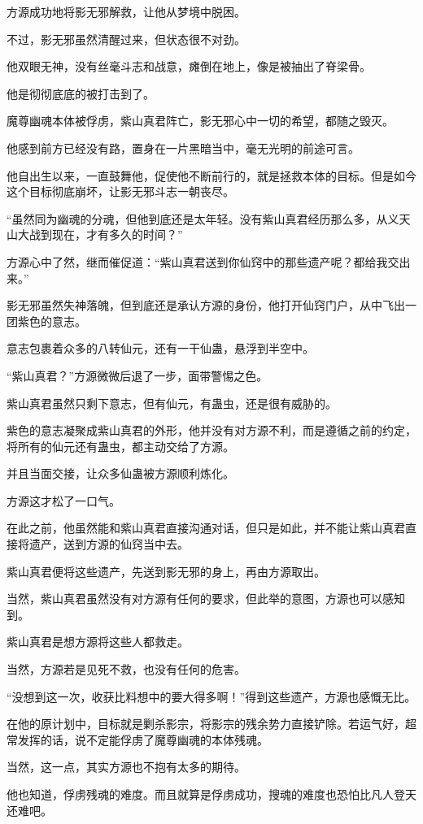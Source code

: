 \begin{this_body}
方源成功地将影无邪解救，让他从梦境中脱困。

不过，影无邪虽然清醒过来，但状态很不对劲。

他双眼无神，没有丝毫斗志和战意，瘫倒在地上，像是被抽出了脊梁骨。

他是彻彻底底的被打击到了。

魔尊幽魂本体被俘虏，紫山真君阵亡，影无邪心中一切的希望，都随之毁灭。

他感到前方已经没有路，置身在一片黑暗当中，毫无光明的前途可言。

他自出生以来，一直鼓舞他，促使他不断前行的，就是拯救本体的目标。但是如今这个目标彻底崩坏，让影无邪斗志一朝丧尽。

“虽然同为幽魂的分魂，但他到底还是太年轻。没有紫山真君经历那么多，从义天山大战到现在，才有多久的时间？”

方源心中了然，继而催促道：“紫山真君送到你仙窍中的那些遗产呢？都给我交出来。”

影无邪虽然失神落魄，但到底还是承认方源的身份，他打开仙窍门户，从中飞出一团紫色的意志。

意志包裹着众多的八转仙元，还有一干仙蛊，悬浮到半空中。

“紫山真君？”方源微微后退了一步，面带警惕之色。

紫山真君虽然只剩下意志，但有仙元，有蛊虫，还是很有威胁的。

紫色的意志凝聚成紫山真君的外形，他并没有对方源不利，而是遵循之前的约定，将所有的仙元还有蛊虫，都主动交给了方源。

并且当面交接，让众多仙蛊被方源顺利炼化。

方源这才松了一口气。

在此之前，他虽然能和紫山真君直接沟通对话，但只是如此，并不能让紫山真君直接将遗产，送到方源的仙窍当中去。

紫山真君便将这些遗产，先送到影无邪的身上，再由方源取出。

当然，紫山真君虽然没有对方源有任何的要求，但此举的意图，方源也可以感知到。

紫山真君是想方源将这些人都救走。

当然，方源若是见死不救，也没有任何的危害。

“没想到这一次，收获比料想中的要大得多啊！”得到这些遗产，方源也感慨无比。

在他的原计划中，目标就是剿杀影宗，将影宗的残余势力直接铲除。若运气好，超常发挥的话，说不定能俘虏了魔尊幽魂的本体残魂。

当然，这一点，其实方源也不抱有太多的期待。

他也知道，俘虏残魂的难度。而且就算是俘虏成功，搜魂的难度也恐怕比凡人登天还难吧。

\end{this_body}

